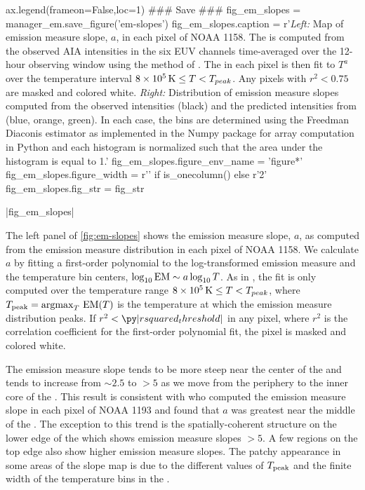 \begin{pycode}[manager_em]
ax.legend(frameon=False,loc=1)
### Save ###
fig_em_slopes = manager_em.save_figure('em-slopes')
fig_em_slopes.caption = r'\textit{Left:} Map of emission measure slope, $a$, in each pixel of \AR{} NOAA 1158. The \dem{} is computed from the observed AIA intensities in the six EUV channels time-averaged over the 12-hour observing window using the method of \citet{hannah_differential_2012}. The \dem{} in each pixel is then fit to $T^a$ over the temperature interval $8\times10^5\,\textup{K}\le T < T_{peak}$. Any pixels with $r^2<0.75$ are masked and colored white. \textit{Right:} Distribution of emission measure slopes computed from the observed intensities (black) and the predicted intensities from  (blue, orange, green). In each case, the bins are determined using the Freedman Diaconis estimator \citep{freedman_histogram_1981} as implemented in the Numpy package for array computation in Python \citep{oliphant_guide_2006} and each histogram is normalized such that the area under the histogram is equal to 1.'
fig_em_slopes.figure_env_name = 'figure*'
fig_em_slopes.figure_width = r'\columnwidth' if is_onecolumn() else r'2\columnwidth'
fig_em_slopes.fig_str = fig_str
\end{pycode}
\py[manager_em]|fig_em_slopes|

The left panel of \autoref{fig:em-slopes} shows the emission measure slope, $a$, as computed from the emission measure distribution in each pixel of \AR{} NOAA 1158. We calculate $a$ by fitting a first-order polynomial to the log-transformed emission measure and the temperature bin centers, $\log_{10}\textup{EM}\sim a\log_{10}T$. As in , the fit is only computed over the temperature range $8\times10^5\,\textup{K}\le T < T_{peak}$, where $T_\textup{peak}=\operatorname*{argmax}_T\,\textup{EM}(T)$ is the temperature at which the emission measure distribution peaks. If $r^2<\py|rsquared_threshold|$ in any pixel, where $r^2$ is the correlation coefficient for the first-order polynomial fit, the pixel is masked and colored white. 

The emission measure slope tends to be more steep near the center of the \AR{} and tends to increase from $\sim2.5$ to $>5$ as we move from the periphery to the inner core of the \AR{}. This result is consistent with \citet{del_zanna_evolution_2015} who computed the emission measure slope in each pixel of \AR{} NOAA 1193 and found that $a$ was greatest near the middle of the \AR{}. The exception to this trend is the spatially-coherent structure on the lower edge of the \AR{} which shows emission measure slopes $>5$. A few regions on the top edge also show higher emission measure slopes. The patchy appearance in some areas of the slope map is due to the different values of $T_\textup{peak}$ and the finite width of the temperature bins in the \dem.

